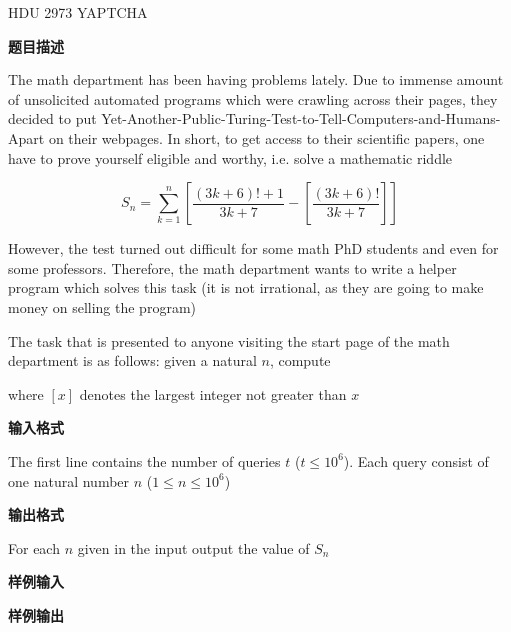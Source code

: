\begin{frame}{HDU 2973 YAPTCHA}
	\label{cgrunt:example:hdu2973}

	\textbf{题目描述}

	The math department has been having problems lately. Due to immense amount of unsolicited automated programs which were crawling across their pages, they decided to put Yet-Another-Public-Turing-Test-to-Tell-Computers-and-Humans-Apart on their webpages. In short, to get access to their scientific papers, one have to prove yourself eligible and worthy, i.e. solve a mathematic riddle

	\begin{equation}
		S_n=\sum_{k=1}^n\left[\frac{(3k+6)!+1}{3k+7}-\left[\frac{(3k+6)!}{3k+7}\right]\right]
	\end{equation}

	However, the test turned out difficult for some math PhD students and even for some professors. Therefore, the math department wants to write a helper program which solves this task (it is not irrational, as they are going to make money on selling the program)

	The task that is presented to anyone visiting the start page of the math department is as follows: given a natural \(n\), compute

	where \([x]\) denotes the largest integer not greater than \(x\)

	\textbf{输入格式}

	The first line contains the number of queries \(t\) (\(t \leqslant 10^6\)). Each query consist of one natural number \(n\) (\(1 \leqslant n \leqslant 10^6\))

	\textbf{输出格式}

	For each \(n\) given in the input output the value of \(S_n\)

	\textbf{样例输入}


	\textbf{样例输出}

\end{frame}


